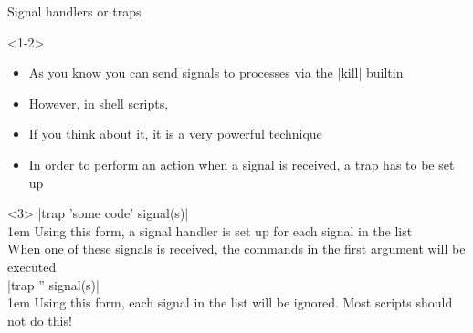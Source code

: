 \begin{frame}{Signal handlers or traps}
    \begin{onlyenv}<1-2>
        \begin{itemize}
            \item As you know you can send signals to processes via the \bash|kill| builtin
            \item However, in shell scripts, 
            \item If you think about it, it is a very powerful technique
            \item In order to perform an action when a signal is received, a trap has to be set up
        \end{itemize}
        \smallskip
        \begin{center}
        \end{center}
    \end{onlyenv}
    \begin{onlyenv}<3>
        \medskip
        \colorbox{background-color}{\bash|trap 'some code' signal(s)|}\\[0.3em]
        \begingroup\leftskip1em
            Using this form, a signal handler is set up for each signal in the list\\
            When one of these signals is received, the commands in the first argument will be executed\\[0.4em]
        \endgroup
        \colorbox{background-color}{\bash|trap '' signal(s)|}\\[0.3em]
        \begingroup\leftskip1em
            Using this form, each signal in the list will be ignored. \alert{Most scripts should not do this!}\\[0.4em]

\end{onlyenv}
\end{frame}
